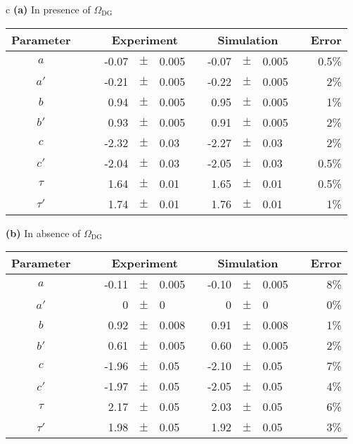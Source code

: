 \clearpage{}

\begin{table}
\begin{centering}
\begin{tabular}{c}
\textbf{(a)} In presence of $\Omega_{\mathrm{DG}}$\tabularnewline
\tabularnewline
\centering{}\renewcommand*{\arraystretch}{1.2} %
\begin{tabular}{cc|crcllrrlcr}
Parameter  & \multicolumn{1}{c|}{} &  & \multicolumn{3}{c}{Experiment} &  & \multicolumn{3}{c}{Simulation} &  & Error\tabularnewline
\hline 
\rule{0pt}{3ex} $a$  &  &  & -0.07  & $\pm$  & 0.005  &  & -0.07  & $\pm$  & 0.005  &  & 0.5\%\tabularnewline
$a'$  &  &  & -0.21  & $\pm$  & 0.005  &  & -0.22  & $\pm$  & 0.005  &  & 2\%\tabularnewline
$b$  &  &  & 0.94  & $\pm$  & 0.005  &  & 0.95  & $\pm$  & 0.005  &  & 1\%\tabularnewline
$b'$  &  &  & 0.93  & $\pm$  & 0.005  &  & 0.91  & $\pm$  & 0.005  &  & 2\%\tabularnewline
$c$  &  &  & -2.32  & $\pm$  & 0.03  &  & -2.27  & $\pm$  & 0.03  &  & 2\%\tabularnewline
$c'$  &  &  & -2.04  & $\pm$  & 0.03  &  & -2.05  & $\pm$  & 0.03  &  & 0.5\%\tabularnewline
$\tau$  &  &  & 1.64  & $\pm$  & 0.01  &  & 1.65  & $\pm$  & 0.01  &  & 0.5\%\tabularnewline
$\tau'$  &  &  & 1.74  & $\pm$  & 0.01  &  & 1.76  & $\pm$  & 0.01  &  & 1\%\tabularnewline
\end{tabular}\tabularnewline
\tabularnewline
\textbf{(b)} In absence of $\Omega_{\mathrm{DG}}$\tabularnewline
\tabularnewline
\centering{}\renewcommand*{\arraystretch}{1.2} %
\begin{tabular}{cc|crcllrrlcr}
Parameter & \multicolumn{1}{c|}{} &  & \multicolumn{3}{c}{Experiment} &  & \multicolumn{3}{c}{Simulation} &  & Error\tabularnewline
\hline 
\rule{0pt}{3ex} $a$ &  &  & -0.11 & $\pm$ & 0.005 &  & -0.10 & $\pm$ & 0.005 &  & 8\%\tabularnewline
$a'$ &  &  & 0 & $\pm$ & 0 &  & 0 & $\pm$ & 0 &  & 0\%\tabularnewline
$b$ &  &  & 0.92 & $\pm$ & 0.008 &  & 0.91 & $\pm$ & 0.008 &  & 1\%\tabularnewline
$b'$ &  &  & 0.61 & $\pm$ & 0.005 &  & 0.60 & $\pm$ & 0.005 &  & 2\%\tabularnewline
$c$ &  &  & -1.96 & $\pm$ & 0.05 &  & -2.10 & $\pm$ & 0.05 &  & 7\%\tabularnewline
$c'$ &  &  & -1.97 & $\pm$ & 0.05 &  & -2.05 & $\pm$ & 0.05 &  & 4\%\tabularnewline
$\tau$ &  &  & 2.17 & $\pm$ & 0.05 &  & 2.03 & $\pm$ & 0.05 &  & 6\%\tabularnewline
$\tau'$ &  &  & 1.98 & $\pm$ & 0.05 &  & 1.92 & $\pm$ & 0.05 &  & 3\%\tabularnewline
\end{tabular}\tabularnewline
\tabularnewline
\end{tabular}
\par\end{centering}

\end{table}
